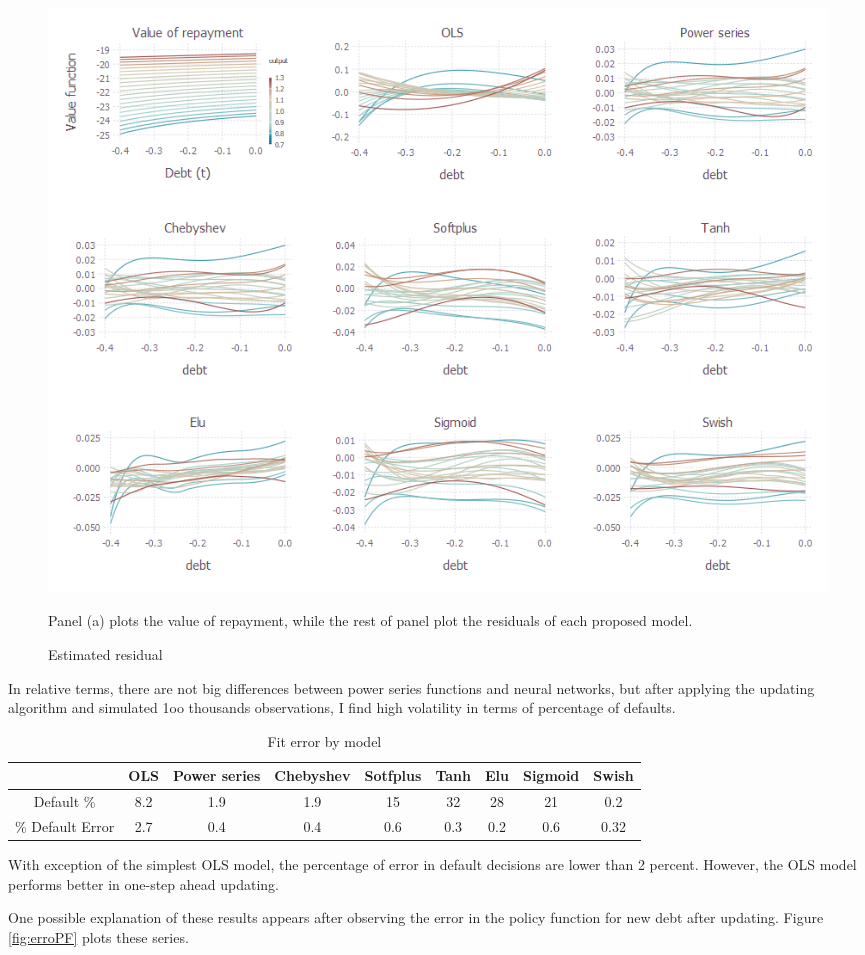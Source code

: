 \documentclass[12pt, a4paper]{article}
\begin{document}
\begin{figure}[!hbt]
	\centering
	\caption{Estimated residual}
	\includegraphics[scale=0.5]{../Plots/res1.png}
	\begin{minipage}{0.85\textwidth}
	{\scriptsize Panel (a)  plots the value of repayment, while the rest of panel plot the residuals of each proposed model.\par}
	\end{minipage}
\end{figure}
\par In relative terms, there are not big differences between power series functions and neural networks, but after applying the updating algorithm and simulated 1oo thousands observations, I find high volatility in terms of percentage of defaults.
\begin{table}[!hbt]
	\centering
	\caption{Fit error by model}
	\vspace{3mm}
	\begin{tabular}{|c|cccccccc|}
		\hline
		& OLS&Power series& Chebyshev&Sotfplus&Tanh&Elu&Sigmoid&Swish\\
		\hline
		Default \%&  8.2 & 1.9 & 1.9 & 15 & 32 & 28 & 21 & 0.2 \\
		\% Default Error& 2.7 & 0.4 & 0.4 &0.6& 0.3&0.2&0.6&0.32\\
		\hline
	\end{tabular}
	\label{tab:1}
\end{table}
With exception of the simplest OLS model, the percentage of error in default decisions are lower than 2 percent. However, the OLS model performs better in one-step ahead updating. 
\par One possible explanation of these results appears after observing the error in the policy function for  new debt after updating. Figure \ref{fig:erroPF} plots these series.
\end{document}
